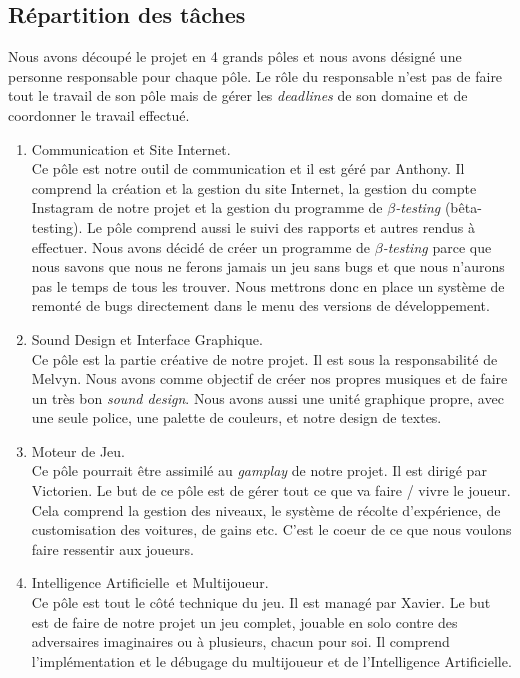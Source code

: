 \documentclass[11pt,a4paper]{article}
\newcommand{\AI}{Intelligence Artificielle}
\begin{document}
  \subsection{Répartition des tâches} 
    Nous avons découpé le projet en 4 grands pôles et nous avons désigné une personne responsable
    pour chaque pôle. Le rôle du responsable n'est pas de faire tout le travail de son pôle mais
    de gérer les \textit{deadlines} de son domaine et de coordonner le travail effectué.
    \begin{enumerate}
      \item Communication et Site Internet.\\
        Ce pôle est notre outil de communication et il est géré par Anthony. Il comprend la création
        et la gestion du site Internet, la gestion du compte Instagram de notre projet \cite{insta} et la
        gestion du programme de \(\beta\)\textit{-testing} (bêta-testing). Le pôle comprend aussi le suivi
        des rapports et autres rendus à effectuer. Nous avons décidé de 
        créer un programme de \(\beta\)\textit{-testing} parce que nous savons que nous ne ferons
        jamais un jeu sans bugs et que nous n'aurons pas le temps de tous les trouver. Nous mettrons
        donc en place un système de remonté de bugs directement dans le menu des versions de développement.
      \item Sound Design et Interface Graphique.\\
        Ce pôle est la partie créative de notre projet. Il est sous la responsabilité de Melvyn.
        Nous avons comme objectif de créer nos propres musiques et de faire un très bon \textit{sound design}.
        Nous avons aussi une unité graphique propre, avec une seule police, une palette de couleurs, et notre
        design de textes.
      \item Moteur de Jeu.\\
        Ce pôle pourrait être assimilé au \textit{gamplay} de notre projet. Il est dirigé par Victorien.
        Le but de ce pôle est de gérer tout ce que va faire / vivre le joueur. Cela comprend la gestion des niveaux,
        le système de récolte d'expérience, de customisation des voitures, de gains etc. C'est le coeur de ce que nous voulons faire ressentir aux joueurs.
      \item \AI\, et Multijoueur.\\
        Ce pôle est tout le côté technique du jeu. Il est managé par Xavier. Le but est de faire de notre projet
        un jeu complet, jouable en solo contre des adversaires imaginaires ou à plusieurs, chacun pour soi. Il comprend l'implémentation et le débugage du multijoueur et de l'\AI.
    \end{enumerate}
  \clearpage
\end{document}
